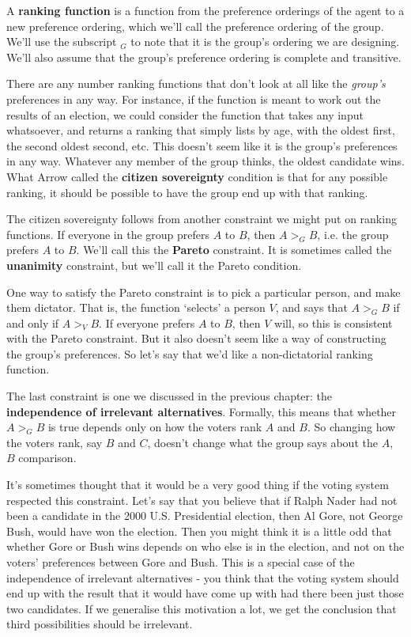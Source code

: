 A \textbf{ranking function} is a function from the preference orderings of the agent to a new preference ordering, which we'll call the preference ordering of the group. We'll use the subscript $_G$ to note that it is the group's ordering we are designing. We'll also assume that the group's preference ordering is complete and transitive. 

There are any number ranking functions that don't look at all like the \textit{group's} preferences in any way. For instance, if the function is meant to work out the results of an election, we could consider the function that takes any input whatsoever, and returns a ranking that simply lists by age, with the oldest first, the second oldest second, etc. This doesn't seem like it is the group's preferences in any way. Whatever any member of the group thinks, the oldest candidate wins. What Arrow called the \textbf{citizen sovereignty} condition is that for any possible ranking, it should be possible to have the group end up with that ranking.

The citizen sovereignty follows from another constraint we might put on ranking functions. If everyone in the group prefers $A$ to $B$, then $A >_G B$, i.e. the group prefers $A$ to $B$. We'll call this the \textbf{Pareto} constraint. It is sometimes called the \textbf{unanimity} constraint, but we'll call it the Pareto condition.

One way to satisfy the Pareto constraint is to pick a particular person, and make them dictator. That is, the function `selects' a person $V$, and says that $A >_G B$ if and only if $A >_V B$. If everyone prefers $A$ to $B$, then $V$ will, so this is consistent with the Pareto constraint. But it also doesn't seem like a way of constructing the group's preferences. So let's say that we'd like a non-dictatorial ranking function.

The last constraint is one we discussed in the previous chapter: the \textbf{independence of irrelevant alternatives}. Formally, this means that whether $A >_G B$ is true depends only on how the voters rank $A$ and $B$. So changing how the voters rank, say $B$ and $C$, doesn't change what the group says about the $A$, $B$ comparison.

It's sometimes thought that it would be a very good thing if the voting system respected this constraint. Let's say that you believe that if Ralph Nader had not been a candidate in the 2000 U.S. Presidential election, then Al Gore, not George Bush, would have won the election. Then you might think it is a little odd that whether Gore or Bush wins depends on who else is in the election, and not on the voters' preferences between Gore and Bush. This is a special case of the independence of irrelevant alternatives - you think that the voting system should end up with the result that it would have come up with had there been just those two candidates. If we generalise this motivation a lot, we get the conclusion that third possibilities should be irrelevant.

